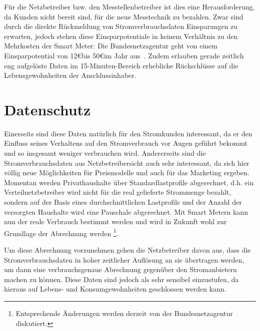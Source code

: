 \documentclass[12pt,BCOR=8.5mm]{scrartcl}
\begin{document}
Für die Netzbetreiber bzw. den Messtellenbetreiber ist dies eine
Herausforderung, da Kunden nicht bereit sind, für die neue Messtechnik
zu bezahlen. Zwar sind durch die direkte Rückmeldung von
Stromverbrauchsdaten Einsparungen zu erwarten,
jedoch stehen diese Einsparpotentiale in keinem Verhältnis zu
den Mehrkosten der Smart Meter: Die Bundesnetzagentur geht von einem
Einsparpotential von 12\euro bis 50\euro im Jahr
aus~\cite[S. 70]{bundesnetzagentur10handlungsoptionen}. Zudem erlauben gerade zeitlich eng
aufgelöste Daten im 15-Minuten-Bereich erhebliche Rückschlüsse auf die
Lebensgewohnheiten der Anschlussinhaber.


\section{Datenschutz}\label{sub:datenschutz}
Einerseits sind diese Daten natürlich für den Stromkunden interessant,
da er den Einfluss seines Verhaltens auf den Stromverbrauch vor Augen
geführt bekommt und so insgesamt weniger verbrauchen wird.  
Andererseits sind die Stromverbrauchsdaten aus Netzbetreibersicht auch
sehr interessant, da sich hier völlig neue Möglichkeiten für
Preismodelle und auch für das Marketing ergeben. Momentan werden
Privathaushalte über Standardlastprofile abgerechnet, d.h. ein
Verteilnetzbetreiber wird nicht für die real gelieferte Strommenge
bezahlt, sondern auf der Basis eines durchschnittlichen Lastprofils und
der Anzahl der versorgten Haushalte wird eine Pauschale abgerechnet. Mit
Smart Metern kann nun der reale Verbrauch bestimmt werden und wird in
Zukunft wohl zur Grundlage der Abrechnung werden \footnote{Entsprechende
Änderungen werden derzeit von der Bundesnetzagentur diskutiert.}. 

Um diese Abrechnung vorzunehmen gehen die Netzbetreiber davon aus, dass
die Stromverbrauchsdaten in hoher zeitlicher Auflösung an sie übertragen
werden, um dann eine verbrauchsgenaue Abrechnung gegenüber den
Stromanbietern machen zu können. Diese Daten sind jedoch als sehr
sensibel einzustufen, da hieraus auf Lebens- und Konsumgewohnheiten
geschlossen werden kann. 
\end{document}
